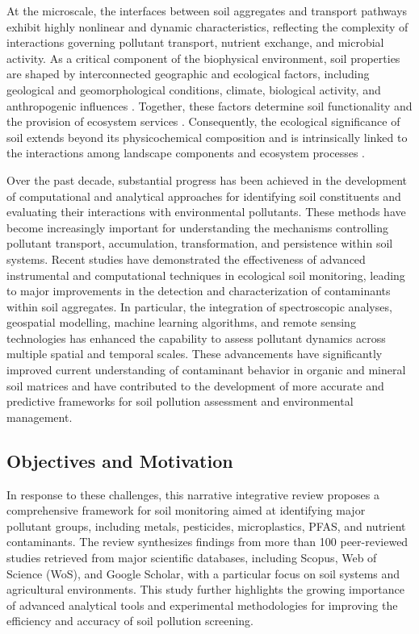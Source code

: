 \documentclass[sn-mathphys-num]{sn-jnl}
\begin{document}
At the microscale, the interfaces between soil aggregates and transport pathways exhibit highly nonlinear and dynamic characteristics, reflecting the complexity of interactions governing pollutant transport, nutrient exchange, and microbial activity. As a critical component of the biophysical environment, soil properties are shaped by interconnected geographic and ecological factors, including geological and geomorphological conditions, climate, biological activity, and anthropogenic influences \cite{Brevik2015,Amundson2019}. Together, these factors determine soil functionality and the provision of ecosystem services \cite{Baveye2016,Klaucol2013,Klaucol2017,Lemenkova2023}. Consequently, the ecological significance of soil extends beyond its physicochemical composition and is intrinsically linked to the interactions among landscape components and ecosystem processes \cite{Lemenkova2025a}.

Over the past decade, substantial progress has been achieved in the development of computational and analytical approaches for identifying soil constituents and evaluating their interactions with environmental pollutants. These methods have become increasingly important for understanding the mechanisms controlling pollutant transport, accumulation, transformation, and persistence within soil systems. Recent studies have demonstrated the effectiveness of advanced instrumental and computational techniques in ecological soil monitoring, leading to major improvements in the detection and characterization of contaminants within soil aggregates. In particular, the integration of spectroscopic analyses, geospatial modelling, machine learning algorithms, and remote sensing technologies has enhanced the capability to assess pollutant dynamics across multiple spatial and temporal scales. These advancements have significantly improved current understanding of contaminant behavior in organic and mineral soil matrices and have contributed to the development of more accurate and predictive frameworks for soil pollution assessment and environmental management.

\subsection{Objectives and Motivation}\label{sec1.3}

In response to these challenges, this narrative integrative review proposes a comprehensive framework for soil monitoring aimed at identifying major pollutant groups, including metals, pesticides, microplastics, PFAS, and nutrient contaminants. The review synthesizes findings from more than 100 peer-reviewed studies retrieved from major scientific databases, including Scopus, Web of Science (WoS), and Google Scholar, with a particular focus on soil systems and agricultural environments. This study further highlights the growing importance of advanced analytical tools and experimental methodologies for improving the efficiency and accuracy of soil pollution screening. 
\end{document}
